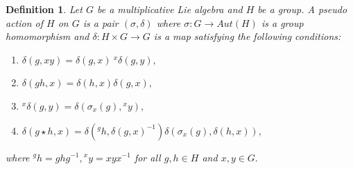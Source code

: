 \documentclass[10 pt,oneside,reqno,a4paper]{amsart}
\newtheorem{definition}{Definition}[section]
\numberwithin{equation}{section}
\begin{document}
\begin{definition}
    Let $G$ be a multiplicative Lie algebra and $H$ be a group. A pseudo action of $H$ on $G$ is a pair $(\sigma,\delta)$ where $\sigma: G \to Aut(H)$ is a group homomorphism and $\delta: H \times G \to G$ is a map satisfying the following conditions:
    \begin{enumerate}
        \item $\delta(g,xy)=\delta(g,x) ~{^x{\delta({g}, {y})}},$
        \item $\delta(gh,x)= \delta({h}, {x}) \delta(g,x),$
        \item ${^x\delta(g,y)}= \delta(\sigma_x(g),{^xy}),$
        \item $\delta(g \star h, {x})=\delta({^gh},\delta(g,x)^{-1})\delta(\sigma_x(g),\delta(h,x)),$
        
    \end{enumerate} 
    where ${^gh}= ghg^{-1}, {^xy}= xyx ^{-1}$ for all $g,h\in H$ and $x,y \in G.$
\end{definition}
\end{document}
